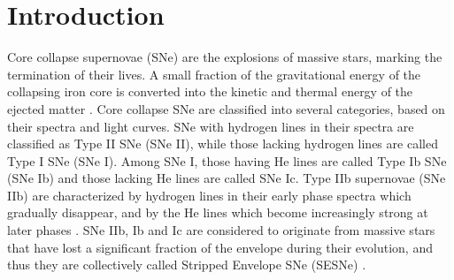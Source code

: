 \documentclass[twocolumn, linenumbers]{aastex62}
\begin{document}

\section{Introduction} \label{sec:intro}
Core collapse supernovae (SNe) are the explosions of massive stars, marking the termination of their lives. A small fraction of the gravitational energy of the collapsing iron core is converted into the kinetic and thermal energy of the ejected matter \citep{2002RvMP...74.1015W}.
Core collapse SNe are classified into several categories, based on their spectra and light curves. SNe with hydrogen lines in their spectra are classified as Type II SNe (SNe II), while those lacking hydrogen lines are called Type I SNe (SNe I). Among SNe I, those having He lines are called Type Ib SNe (SNe Ib) and those lacking He lines are called SNe Ic. Type IIb supernovae (SNe IIb) are characterized by hydrogen lines in their early phase spectra which gradually disappear, and by the He lines which become increasingly strong at later phases \citep{1997ARA&A..35..309F}. SNe IIb, Ib and Ic are considered to originate from massive stars that have lost a significant fraction of the envelope during their evolution, and thus they are collectively called Stripped Envelope SNe (SESNe) \citep{2009MNRAS.395.1409S}.
\end{document}
